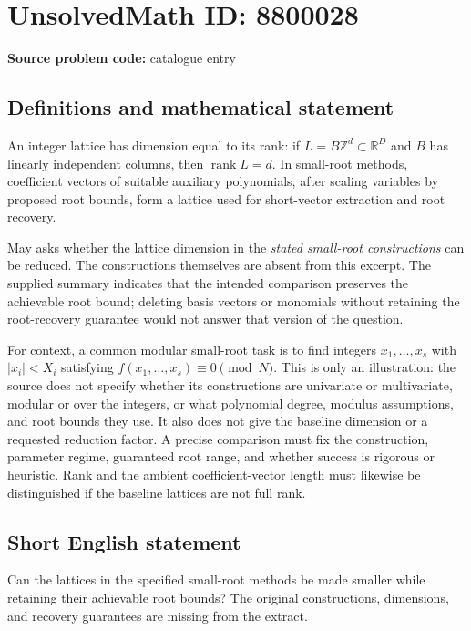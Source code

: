\documentclass[11pt]{article}
\newcommand{\Z}{\mathbb{Z}}
\newcommand{\R}{\mathbb{R}}
\begin{document}
\section*{UnsolvedMath ID: 8800028}
\textbf{Source problem code:} catalogue entry
\subsection{Definitions and mathematical statement}
An integer lattice has dimension equal to its rank: if \(L=B\Z^d\subset\R^D\) and \(B\) has linearly independent columns, then \(\operatorname{rank}L=d\). In small-root methods, coefficient vectors of suitable auxiliary polynomials, after scaling variables by proposed root bounds, form a lattice used for short-vector extraction and root recovery.

May asks whether the lattice dimension in the \emph{stated small-root constructions} can be reduced. The constructions themselves are absent from this excerpt. The supplied summary indicates that the intended comparison preserves the achievable root bound; deleting basis vectors or monomials without retaining the root-recovery guarantee would not answer that version of the question.

For context, a common modular small-root task is to find integers \(x_1,\ldots,x_s\) with \(|x_i|<X_i\) satisfying \(f(x_1,\ldots,x_s)\equiv0\pmod N\). This is only an illustration: the source does not specify whether its constructions are univariate or multivariate, modular or over the integers, or what polynomial degree, modulus assumptions, and root bounds they use. It also does not give the baseline dimension or a requested reduction factor. A precise comparison must fix the construction, parameter regime, guaranteed root range, and whether success is rigorous or heuristic. Rank and the ambient coefficient-vector length must likewise be distinguished if the baseline lattices are not full rank.
\subsection{Short English statement}
Can the lattices in the specified small-root methods be made smaller while retaining their achievable root bounds? The original constructions, dimensions, and recovery guarantees are missing from the extract.
\end{document}
